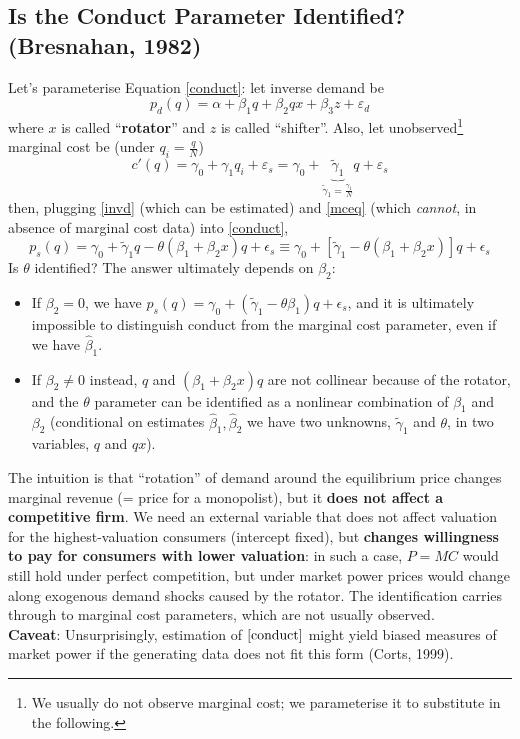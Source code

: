 \documentclass[11pt]{article}
\numberwithin{equation}{section}
\begin{document}
\subsection{Is the Conduct Parameter Identified? (Bresnahan, 1982)}

Let's parameterise Equation \eqref{conduct}: let inverse demand be
\begin{equation}
	\label{invd}
	p_d(q) = \alpha + \beta_1 q + \beta_2 q x + \beta_3 z + \varepsilon_d
\end{equation}
where $x$ is called ``\textbf{rotator}'' and $z$ is called ``shifter''. Also, let unobserved\footnote{We usually do not observe marginal cost; we parameterise it to substitute in the following.} marginal cost be (under $q_i = \frac{q}{N}$)
\begin{equation}
	\label{mceq}
	c'(q) = \gamma_0 + \gamma_1 q_i + \varepsilon_s =  \gamma_0 + \underbrace{\tilde{\gamma}_1}_{\tilde{\gamma}_1 = \frac{\gamma_1}{N}} q + \varepsilon_s
\end{equation}
then, plugging \eqref{invd} (which can be estimated) and \eqref{mceq} (which \textit{cannot}, in absence of marginal cost data) into \eqref{conduct},
\begin{equation}
	p_s(q) = \gamma_0 + \tilde{\gamma}_1 q - \theta (\beta_1 + \beta_2x) q + \epsilon_s \equiv  \gamma_0 + [\tilde{\gamma}_1 - \theta (\beta_1 + \beta_2x)] q + \epsilon_s
\end{equation}
Is $\theta$ identified? The answer ultimately depends on $\beta_2$:
\begin{itemize}
	\item If $\beta_2 = 0$, we have $p_s(q) = \gamma_0 +(\tilde{\gamma}_1 - \theta \beta_1) q+ \epsilon_s$, and it is ultimately impossible to distinguish conduct from the marginal cost parameter, even if we have $\hat{\beta}_1$.
	\item If $\beta_2 \neq 0$ instead, $q$ and $(\beta_1 + \beta_2x)q$ are not collinear because of the rotator, and the $\theta$ parameter can be identified as a nonlinear combination of $\beta_1$ and $\beta_2$ (conditional on estimates $\hat{\beta}_1, \hat{\beta}_2$ we have two unknowns, $\tilde{\gamma}_1$ and $\theta$, in two variables, $q$ and $qx$).
\end{itemize}
The intuition is that ``rotation'' of demand around the equilibrium price changes marginal revenue (= price for a monopolist), but it \textbf{does not affect a competitive firm}.
We need an external variable that does not affect valuation for the highest-valuation consumers (intercept fixed), but \textbf{changes willingness to pay for consumers with lower valuation}: in such a case, $P=MC$ would still hold under perfect competition, but under market power prices would change along exogenous demand shocks caused by the rotator.
The identification carries through to marginal cost parameters, which are not usually observed. \\
\textbf{Caveat}: Unsurprisingly, estimation of $\eqref{conduct}$ might yield biased measures of market power if the generating data does not fit this form (Corts, 1999).
\end{document}
